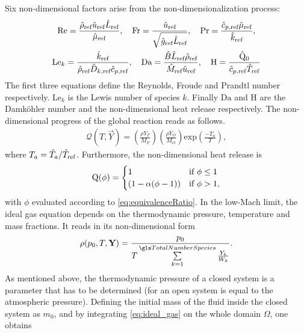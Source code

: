 Six non-dimensional factors arise from the non-dimensionalization process:
\begin{gather*}
\text{Re} = \frac{\RefVal{\rho} \RefVal{u}  \RefVal{L}}{\RefVal{\Viscosity}}, \quad
\text{Fr} = \frac{\RefVal{u}}{\sqrt{\RefVal{g}\RefVal{L}}}, \quad
\text{Pr} = \frac{\RefValS{c}{p} \RefVal{\Viscosity}}{\RefVal{k}},\\%
\text{Le}_k = \frac{\RefVal{k}}{\RefVal{\rho} \RefValS{D}{k} \RefValS{c}{p}}, \quad
\Da = \frac{\hat B \RefVal{L} \RefVal{\rho}}{\RefVal{M}\RefVal{u}}, \quad \label{eq:Dahmkoeler}
\text{H} = \frac{\hat \heatRelease_0}{\RefValS{c}{p} \RefVal{T}}%
\end{gather*} 
The first three equations define the Reynolds, Froude and Prandtl number respectively. $\text{Le}_k$ is the Lewis number of species $k$. Finally $\text{Da}$ and H are the Damköhler number and the non-dimensional heat release respectively. The non-dimensional progress of the global reaction reads as follows.
\begin{align}
\mathcal{Q}(T, \vec{Y})  = \left(\frac{\rho Y_F}{M_F}\right) \left(\frac{\rho Y_O}{M_O}\right)\text{exp}\left(\frac{-T_a}{T}\right), \label{eq:NonDimArr}
\end{align}
where $T_a = \hat{T}_a / \hat T_{\text{ref}}$. Furthermore, the non-dimensional heat release is
\begin{equation}
\mathrm{Q}(\phi)=
\begin{cases}
1 &\text{if}~ \phi \leq 1\\
(1 - \alpha(\phi -1))&\text{if}~\phi > 1,
\end{cases}  \label{eq:heatReleaseOneStepNonDim}     
\end{equation}
with $\phi$ evaluated according to \cref{eq:equivalenceRatio}. In the low-Mach limit, the ideal gas equation depends on the thermodynamic pressure, temperature and mass fractions. It reads in its non-dimensional form 
\begin{align} \label{eq:ideal_gas}
\rho(p_0,T, \vec{Y}) = \frac{p_0}{T \SumOvAllns \frac{Y_k}{W_k}}.
\end{align}
As mentioned above, the thermodynamic pressure of a closed system is a parameter that has to be determined (for an open system is equal to the atmospheric pressure). Defining the initial mass of the fluid inside the closed system as $m_0$, and by integrating \cref{eq:ideal_gas} on the whole domain $\Omega$, one obtains 
